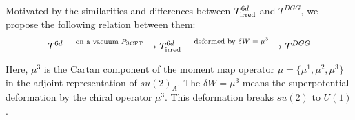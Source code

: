 \documentclass[a4paper,11pt]{article}
\begin{document}
%
%
%

Motivated by the similarities and differences between $T_{\rm irred}^{6d}$ and $T^{DGG}$, we propose the following relation between them:
%
\begin{align}
T^{6d} \xrightarrow[\text{}]{\textrm{\quad on a vacuum $P_{\rm SCFT}$} \quad} T^{6d}_{\rm irred} \xrightarrow[\text{}]{\textrm{\quad deformed by $\delta W = \mu^3$} \quad} T^{DGG} \label{Relation-T6d-TDGG}
\end{align}
%
Here, $\mu^3$ is the Cartan component of the moment map operator ${\mu}=\{\mu^1,\mu^2,\mu^3\}$ in the adjoint representation of $su(2)_A$.
The $\delta W = \mu^3$ means the superpotential deformation by the chiral operator $\mu^3$. This deformation breaks $su(2)$ to $U(1)$.
\end{document}
